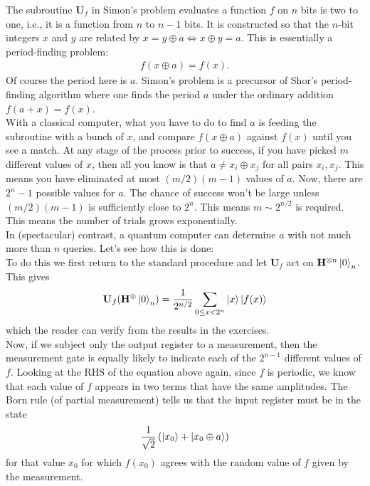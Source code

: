 \documentclass{book}
\theoremstyle{definition}
\newcommand{\f}[2]{\frac{#1}{#2}}
\newcommand{\lp}{\left(}
\newcommand{\rp}{\right)}
\newcommand{\U}{\mathbf{U}}
\newcommand{\had}{\mathbf{H}}
\begin{document}
The subroutine $\U_f$ in Simon's problem evaluates a function $f$ on $n$ bits is two to one, i.e., it is a function from $n$ to $n-1$ bits. It is constructed so that the $n$-bit integers $x$ and $y$ are related by $x = y\oplus a \iff x \oplus y = a$. This is essentially a period-finding problem:
\begin{align}
f(x \oplus a) =  f(x).
\end{align} 
Of course the period here is $a$. Simon's problem is a precursor of Shor's period-finding algorithm where one finds the period $a$ under the ordinary addition $f(a+x) = f(x)$. \\

With a classical computer, what you have to do to find $a$ is feeding the subroutine with a bunch of $x$, and compare $f(x\oplus a)$ against $f(x)$ until you see a match. At any stage of the process prior to success, if you have picked $m$ different values of $x$, then all you know is that $a\neq x_i \oplus x_j$ for all pairs $x_i,x_j$. This means you have eliminated at most $(m/2)(m-1)$ values of $a$. Now, there are $2^n-1$ possible values for $a$. The chance of success won't be large unless  $(m/2)(m-1)$ is sufficiently close to $2^n$. This means $m\sim 2^{n/2}$ is required. This means the number of trials grows exponentially. \\

In (spectacular) contrast, a quantum computer can determine $a$ with not much more than $n$ queries. Let's see how this is done:\\

To do this we first return to the standard procedure and let $\U_f$ act on $\had^{\otimes n}\ket{0}_n$. This gives
\begin{align}
\U_f (\had^{\otimes} \ket{0}_n) = \f{1}{2^{n/2}}\sum_{0\leq x < 2^n} \ket{x}\ket{f(x)}
\end{align}
which the reader can verify from the results in the exercises. \\

Now, if we subject only the output register to a measurement, then the measurement gate is equally likely to indicate each of the $2^{n-1}$ different values of $f$. Looking at the RHS of the equation above again, since $f$ is periodic, we know that each value of $f$ appears in two terms that have the same amplitudes. The Born rule (of partial measurement) tells us that the input register must be in the state
\begin{align}
\f{1}{\sqrt{2}}\lp \ket{x_0} + \ket{x_0 \oplus a} \rp
\end{align}
for that value $x_0$ for which $f(x_0)$ agrees with the random value of $f$ given by the measurement. \\
\end{document}
